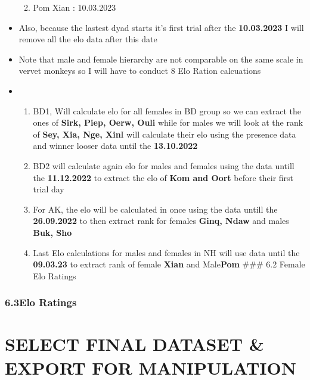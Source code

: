 \documentclass[
]{article}
\providecommand{\tightlist}{%
  \setlength{\itemsep}{0pt}\setlength{\parskip}{0pt}}
\begin{document}
\begin{itemize}
  \begin{enumerate}
  \def\labelenumi{\roman{enumi}.}
  \tightlist
  \item
    Pom Xian : 10.03.2023
  \end{enumerate}
\item
  Also, because the lastest dyad starts it's first trial after the
  \textbf{10.03.2023} I will remove all the elo data after this date
\item
  Note that male and female hierarchy are not comparable on the same
  scale in vervet monkeys so I will have to conduct 8 Elo Ration
  calcuations
\item
  \begin{enumerate}
  \def\labelenumi{\arabic{enumi}.}
  \tightlist
  \item
    BD1, Will calculate elo for all females in BD group so we can
    extract the ones of \textbf{Sirk, Piep, Oerw, Ouli} while for males
    we will look at the rank of \textbf{Sey, Xia, Nge, Xin}I will
    calculate their elo using the presence data and winner looser data
    until the \textbf{13.10.2022}
  \item
    BD2 will calculate again elo for males and females using the data
    untill the \textbf{11.12.2022} to extract the elo of \textbf{Kom and
    Oort} before their first trial day
  \item
    For AK, the elo will be calculated in once using the data untill the
    \textbf{26.09.2022} to then extract rank for females \textbf{Ginq,
    Ndaw} and males \textbf{Buk, Sho}
  \item
    Last Elo calculations for males and females in NH will use data
    until the \textbf{09.03.23} to extract rank of female \textbf{Xian}
    and Male\textbf{Pom} \#\#\# 6.2 Female Elo Ratings
  \end{enumerate}
\end{itemize}

\hypertarget{elo-ratings}{%
\subsubsection{6.3Elo Ratings}\label{elo-ratings}}

\hypertarget{select-final-dataset-export-for-manipulation}{%
\section{SELECT FINAL DATASET \& EXPORT FOR
MANIPULATION}\label{select-final-dataset-export-for-manipulation}}
\end{document}

